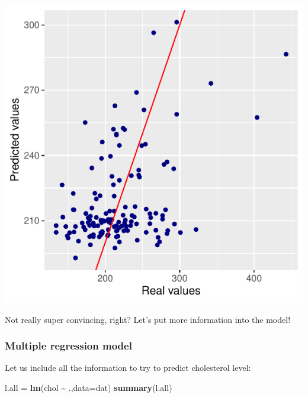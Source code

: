 \documentclass[
]{book}
\newenvironment{Shaded}{\begin{snugshade}}{\end{snugshade}}
\newcommand{\AttributeTok}[1]{\textcolor[rgb]{0.13,0.29,0.53}{#1}}
\newcommand{\FunctionTok}[1]{\textcolor[rgb]{0.13,0.29,0.53}{\textbf{#1}}}
\newcommand{\NormalTok}[1]{#1}
\newcommand{\OtherTok}[1]{\textcolor[rgb]{0.56,0.35,0.01}{#1}}
\newcommand{\SpecialCharTok}[1]{\textcolor[rgb]{0.81,0.36,0.00}{\textbf{#1}}}
\begin{document}
\includegraphics{_main_files/figure-latex/unnamed-chunk-155-1.pdf}

Not really super convincing, right? Let's put more information into the model!

\hypertarget{multiple-regression-model}{%
\subsubsection{Multiple regression model}\label{multiple-regression-model}}

Let us include all the information to try to predict cholesterol level:

\begin{Shaded}
\begin{Highlighting}[]
\NormalTok{l.all }\OtherTok{=} \FunctionTok{lm}\NormalTok{(chol }\SpecialCharTok{\textasciitilde{}}\NormalTok{ .,}\AttributeTok{data=}\NormalTok{dat)}
\FunctionTok{summary}\NormalTok{(l.all)}
\end{Highlighting}
\end{Shaded}
\end{document}
